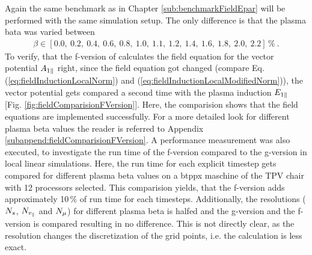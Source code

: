 Again the same benchmark as in Chapter \ref{sub:benchmarkFieldEpar} will be performed with the same simulation setup. The only difference is that the plasma bata was varied between
\begin{gather}
    \beta \in [0.0,~0.2,~0.4,~0.6,~0.8,~1.0,~1.1,~1.2,~1.4,~1.6,~1.8,~2.0,~2.2]\,\%~.
\end{gather}
To verify, that the f-version of {\gkw} calculates the field equation for the vector potential $A_{1\parallel}$ right, since the field equation got changed (compare Eq. (\ref{eq:fieldInductionLocalNorm}) and (\ref{eq:fieldInductionLocalModifiedNorm})), the vector potential gets compared a second time with the plasma induction $E_{1\parallel}$ [Fig. \ref{fig:fieldComparisionFVersion}]. Here, the comparision shows that the field equations are implemented successfully. For a more detailed look for different plasma beta values the reader is referred to Appendix \ref{subappend:fieldComparisionFVersion}. A performance measurement was also executed, to investigate the run time of the f-version compared to the g-version in local linear simulations. Here, the run time for each explicit timestep gets compared for different plasma beta values on a btppx maschine of the TPV chair with 12 processors selected. This comparision yields, that the f-version adds approximately 10\,\% of run time for each timesteps. Additionally, the resolutions ($N_s$, $N_{v_\parallel}$ and $N_\mu$) for different plasma beta is halfed and the g-version and the f-version is compared resulting in no difference. This is not directly clear, as the resolution changes the discretization of the grid points, i.e. the calculation is less exact.


